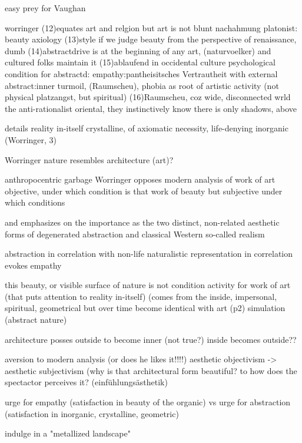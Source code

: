 \documentclass{article}
\begin{document}
easy prey for Vaughan




worringer (12)equates art and relgion
but art is not blunt nachahmung 
platonist: beauty axiology
(13)style
if we judge beauty from the perspective of renaissance, dumb
(14)abstractdrive is at the beginning of any art, (naturvoelker)
and cultured folks maintain it
(15)ablaufend in occidental culture
psychological condition for abstractd:
empathy:pantheisitsches Vertrautheit with external
abstract:inner turmoil, (Raumscheu), 
phobia as root of artistic activity (not physical platzangst, but spiritual)
(16)Raumscheu, coz wide, disconnected wrld 
the anti-rationalist oriental, they instinctively know there is only 
shadows, above 








details reality in-itself
crystalline, of axiomatic necessity, life-denying inorganic
(Worringer, 3)

Worringer
nature resembles architecture (art)?


anthropocentric garbage
Worringer opposes modern analysis of work of art
objective, under which condition is that work of beauty
but subjective under which conditions 

and emphasizes on the importance 
as the two distinct, non-related  aesthetic forms 
of degenerated abstraction and classical Western so-called realism

abstraction in correlation with non-life
naturalistic representation in correlation evokes empathy

this beauty, or visible surface of nature 
is not condition activity for work of art 
(that puts attention to reality in-itself)
(comes from the inside, impersonal, spiritual, geometrical 
but over time become identical with art (p2)
simulation (abstract nature)

architecture
posses outside to become inner (not true?)
inside becomes outside??

aversion to modern analysis (or does he likes it!!!!)
aesthetic objectivism -> aesthetic subjectivism
(why is that architectural form beautiful? 
to how does the spectactor perceives it? (einfühlungsästhetik)

urge for empathy 
(satisfaction in beauty of the organic)
vs 
urge for abstraction (satisfaction in inorganic, crystalline, geometric)




indulge in a "metallized landscape"
\end{document}
